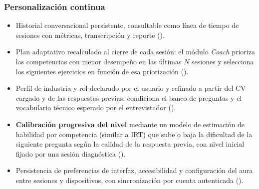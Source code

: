 \subsubsection{Personalización continua}
\begin{itemize}
  \item Historial conversacional persistente, consultable como línea
        de tiempo de sesiones con métricas, transcripción y reporte
        ().
  \item Plan adaptativo recalculado al cierre de cada sesión: el
        módulo \textit{Coach} prioriza las competencias con menor
        desempeño en las últimas $N$ sesiones y selecciona los
        siguientes ejercicios en función de esa priorización ().
  \item Perfil de industria y rol declarado por el usuario y refinado
        a partir del CV cargado y de las respuestas previas; condiciona
        el banco de preguntas y el vocabulario técnico esperado por el
        entrevistador ().
  \item \textbf{Calibración progresiva del nivel} mediante un modelo
        de estimación de habilidad por competencia (similar a IRT) que
        sube o baja la dificultad de la siguiente pregunta según la
        calidad de la respuesta previa, con nivel inicial fijado por
        una sesión diagnóstica ().
  \item Persistencia de preferencias de interfaz, accesibilidad y
        configuración del aura entre sesiones y dispositivos, con
        sincronización por cuenta autenticada ().
\end{itemize}

